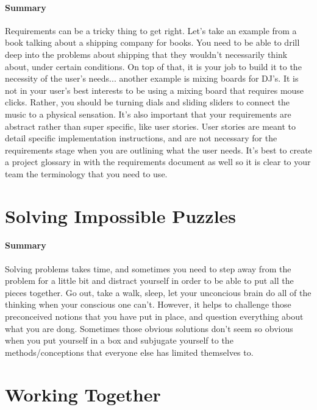 \documentclass{article}
\begin{document}
    \paragraph{Summary} Requirements can be a tricky thing to get right. Let's take an example from a book talking about a shipping company for books. You need to be able to drill deep into the problems about shipping that they wouldn't necessarily think about, under certain conditions. On top of that, it is your job to build it to the necessity of the user's needs... another example is mixing boards for DJ's. It is not in your user's best interests to be using a mixing board that requires mouse clicks. Rather, you should be turning dials and sliding sliders to connect the music to a physical sensation. It's also important that your requirements are abstract rather than super specific, like user stories. User stories are meant to detail specific implementation instructions, and are not necessary for the requirements stage when you are outlining what the user needs. It's best to create a project glossary in with the requirements document as well so it is clear to your team the terminology that you need to use.

\section{Solving Impossible Puzzles}
    \paragraph{Summary} Solving problems takes time, and sometimes you need to step away from the problem for a little bit and distract yourself in order to be able to put all the pieces together. Go out, take a walk, sleep, let your unconcious brain do all of the thinking when your conscious one can't. However, it helps to challenge those preconceived notions that you have put in place, and question everything about what you are dong. Sometimes those obvious solutions don't seem so obvious when you put yourself in a box and subjugate yourself to the methods/conceptions that everyone else has limited themselves to.

\section{Working Together}
\end{document}

